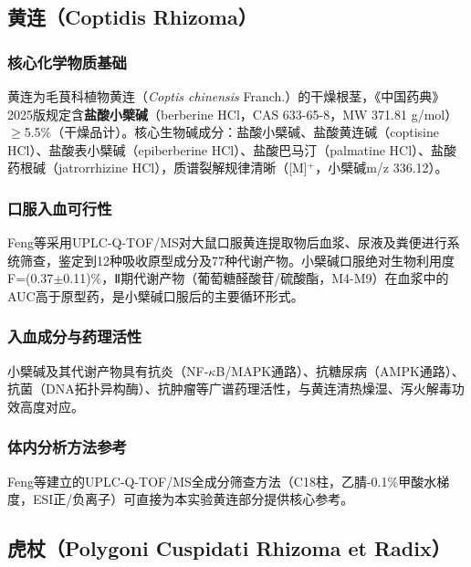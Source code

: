 \documentclass[12pt,a4paper,UTF8,openany]{ctexbook}
\newcommand{\compoundname}[1]{\textbf{#1}}
\newcommand{\herbname}[1]{\textit{#1}}
\begin{document}
\subsection{黄连（Coptidis Rhizoma）}

\subsubsection{核心化学物质基础}

黄连为毛茛科植物黄连（\herbname{Coptis chinensis} Franch.）的干燥根茎，《中国药典》2025版规定含\compoundname{盐酸小檗碱}（berberine HCl，CAS 633-65-8，MW 371.81 g/mol）$\geq$5.5\%（干燥品计）。核心生物碱成分：盐酸小檗碱、盐酸黄连碱（coptisine HCl）、盐酸表小檗碱（epiberberine HCl）、盐酸巴马汀（palmatine HCl）、盐酸药根碱（jatrorrhizine HCl），质谱裂解规律清晰（[M]$^+$，小檗碱m/z 336.12）\cite{FengX2020}。

\subsubsection{口服入血可行性}

Feng等\cite{FengX2020}采用UPLC-Q-TOF/MS对大鼠口服黄连提取物后血浆、尿液及粪便进行系统筛查，鉴定到12种吸收原型成分及77种代谢产物。小檗碱口服绝对生物利用度F=(0.37$\pm$0.11)\%，Ⅱ期代谢产物（葡萄糖醛酸苷/硫酸酯，M4-M9）在血浆中的AUC高于原型药，是小檗碱口服后的主要循环形式\cite{FengX2021}。

\subsubsection{入血成分与药理活性}

小檗碱及其代谢产物具有抗炎（NF-$\kappa$B/MAPK通路）、抗糖尿病（AMPK通路）、抗菌（DNA拓扑异构酶）、抗肿瘤等广谱药理活性，与黄连清热燥湿、泻火解毒功效高度对应\cite{ChenY2015}。

\subsubsection{体内分析方法参考}

Feng等\cite{FengX2020}建立的UPLC-Q-TOF/MS全成分筛查方法（C18柱，乙腈-0.1\%甲酸水梯度，ESI正/负离子）可直接为本实验黄连部分提供核心参考。

\subsection{虎杖（Polygoni Cuspidati Rhizoma et Radix）}
\end{document}

